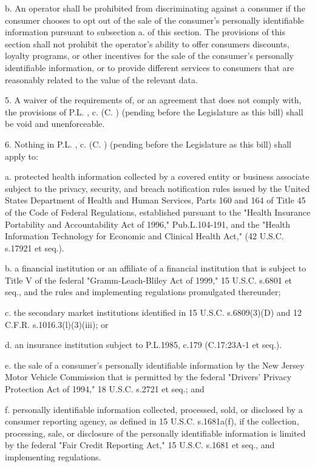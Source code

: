      b.    An operator shall be prohibited from discriminating against a consumer if the consumer chooses to opt out of the sale of the consumer's personally identifiable information pursuant to subsection a. of this section. The provisions of this section shall not prohibit the operator's ability to offer consumers discounts, loyalty programs, or other incentives for the sale of the consumer's personally identifiable information, or to provide different services to consumers that are reasonably related to the value of the relevant data.

 

     5.    A waiver of the requirements of, or an agreement that does not comply with, the provisions of P.L.    , c.    (C.      ) (pending before the Legislature as this bill) shall be void and unenforceable.

 

     6.    Nothing in P.L.    , c.    (C.      ) (pending before the Legislature as this bill) shall apply to:

     a.     protected health information collected by a covered entity or business associate subject to the privacy, security, and breach notification rules issued by the United States Department of Health and Human Services, Parts 160 and 164 of Title 45 of the Code of Federal Regulations, established pursuant to the "Health Insurance Portability and Accountability Act of 1996," Pub.L.104-191, and the "Health Information Technology for Economic and Clinical Health Act," (42 U.S.C. s.17921 et seq.).

     b.    a financial institution or an affiliate of a financial institution that is subject to Title V of the federal "Gramm-Leach-Bliley Act of 1999," 15 U.S.C. s.6801 et seq., and the rules and implementing regulations promulgated thereunder; 

     c.     the secondary market institutions identified in 15 U.S.C. s.6809(3)(D) and 12 C.F.R. s.1016.3(l)(3)(iii); or

     d.    an insurance institution subject to P.L.1985, c.179 (C.17:23A-1 et seq.).

     e.     the sale of a consumer's personally identifiable information by the New Jersey Motor Vehicle Commission that is permitted by the federal "Drivers' Privacy Protection Act of 1994," 18 U.S.C. s.2721 et seq.; and

     f.     personally identifiable information collected, processed, sold, or disclosed by a consumer reporting agency, as defined in 15 U.S.C. s.1681a(f), if the collection, processing, sale, or disclosure of the personally identifiable information is limited by the federal "Fair Credit Reporting Act," 15 U.S.C. s.1681 et seq., and implementing regulations.

